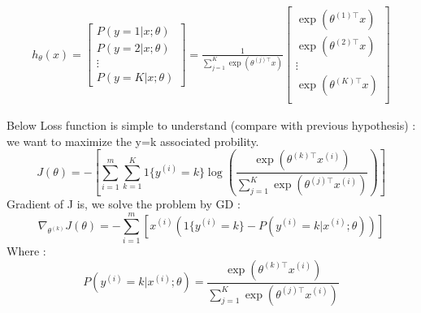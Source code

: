 \documentclass{article}
\begin{document}
\begin{align}
h_\theta(x) =
\begin{bmatrix}
P(y = 1 | x; \theta) \\
P(y = 2 | x; \theta) \\
\vdots \\
P(y = K | x; \theta)
\end{bmatrix}
=
\frac{1}{ \sum_{j=1}^{K}{\exp(\theta^{(j)\top} x) }}
\begin{bmatrix}
\exp(\theta^{(1)\top} x ) \\
\exp(\theta^{(2)\top} x ) \\
\vdots \\
\exp(\theta^{(K)\top} x ) \\
\end{bmatrix}
\end{align}

Below Loss function  is simple to understand (compare with previous hypothesis)  : we want to maximize the y=k associated probility. 
\[J(\theta) = -\left[ \sum_{i=1}^m \sum_{k=1}^K 1\{y^{(i)}=k\} \log \left( \frac{\exp(\theta^{(k)\top} x^{(i)})}{\sum_{j=1}^K \exp(\theta^{(j)\top} x^{(i)})} \right) \right]\]
Gradient of J is, we solve the problem by  GD : 
\[\nabla_{\theta^{(k)}} J(\theta) = -\sum_{i=1}^m \left[ x^{(i)} \left( 1\{y^{(i)}=k\} - P(y^{(i)}=k|x^{(i)};\theta) \right) \right]\]
Where : 
\[P(y^{(i)}=k|x^{(i)};\theta) = \frac{\exp(\theta^{(k)\top} x^{(i)})}{\sum_{j=1}^K \exp(\theta^{(j)\top} x^{(i)})}\]

\end{document}
